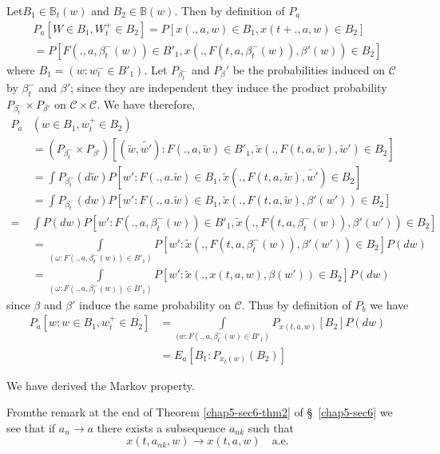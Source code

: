 Let\pageoriginale $B_1 \in \mathbb{B}_t (w)$ and $B_2 \in
\mathbb{B}(w)$. Then by definition of $P_a$ 
\begin{multline*}
  P_a [W \in B_1, W^+_t \in B_2]= P[x( . , a, w) \in B_1, x(t + . ,
    a, w) \in B_2] \\ 
  = P[F( . ,a, \beta^-_t (w)) \in B'_1, x( . , F(t, a, \beta^-_t
    (w)), \beta{'}(w)) \in B_2] 
\end{multline*}
where $B_1= (w: w^-_t \in B{'}_1)$. Let $P_{\beta^-_t}$ and
$P_\beta{'}$ be the probabilities induced on $\mathscr{C}$ by
$\beta^-_t$ and $\beta'$; since they are independent they induce the product
probability $P_{\beta_{t}^-} \times P_{\beta{'}}$ on
$\mathscr{C}\times  \mathscr{C}$.  We have therefore, 
\begin{align*}
  P_a & (w \in B_1, w^+_t \in B_2)\\ 
  & = (P_{\beta^-_t} \times P_{\beta
    {'}}) [(\tilde{w}, \tilde{w'}) : F ( . , a, \tilde{w}) \in B'_1,
    \tilde{x}( . , F(t, a, \tilde{w}), \tilde{w}') \in B_2]\\ 
  &= \int P_{\beta^-_t}(d \tilde{w}) P [w' : F ( . , a. \tilde{w}) \in
    B_1, \tilde{x}( . , F(t, a, \tilde{w}), \tilde{w'}) \in B_2]\\ 
  &= \int P_{\beta^-_t}(d w) P [w' : F ( . , a. \tilde{w}) \in B_1,
    \tilde{x}( . ,F(t, a, \tilde{w}), \beta{'} (w')) \in B_2]\\ 
  =& \int P(d w) P [w' : F ( . , a, \beta^-_t (w)) \in B'_1,
    \tilde{x}( . , F(t, a, \beta^-_t (w)),\beta' (w')) \in  B_2]\\ 
  &=\int\limits_{(\omega : F ( . , a, \beta^-_t (w)) \in B'_1)} P[w' :
    \tilde{x} ( . , F(t, a, \beta^-_t (w)), \beta' (w')) \in B_2]
  P(dw)\\ 
  &=\int\limits_{(\omega : F ( . , a, \beta^-_t (w)) \in B'_1)} P[w' :
    \tilde{x} ( . , x(t, a, w), \beta (w')) \in B_2] P(dw) 
\end{align*}
since $\beta$ and $\beta '$ induce the same probability on
$\mathscr{C}$. Thus by definition of $P_b$ we have 
\begin{align*}
  P_a[w : w \in B_1, w^+_t \in B_2] & = \int\limits_{(w : F ( . , a,
    \beta^-_t (w) \in B'_1)} P_{x(t, a, w)}[B_2] P(dw) \\ 
  & = E_a [B_1 : P_{x_t (w)} (B_2)]
\end{align*}

We have derived the Markov property.

From\pageoriginale the remark at the end of Theorem \ref{chap5-sec6-thm2} of
\S\ \ref{chap5-sec6} we see that if 
$a_n \rightarrow a$ there exists a subsequence $a_{nk}$ such that 
$$
x(t, a_{nk}, w) \rightarrow x(t, a, w)\quad\text{a.e.}
$$

